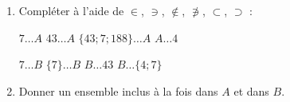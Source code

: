 \documentclass[main.tex]{subfiles}
\begin{document}
\begin{exerciseT} \hfill 
	\begin{enumerate}[leftmargin=*]
		\item 	Compléter à l'aide de $\in$, $\ni$, $\notin$, $\not\ni$, $\subset$, $\supset$  :
		
		$ 7\ldots A$ \qquad $43 \ldots A$ \qquad $\{43; 7; 188\} \ldots A$ \qquad $A\ldots 4$ 
		
		$ 7\ldots B$ \qquad $ \{7\}\ldots B$ \qquad $B \ldots 43$ \qquad $B\ldots \{ 4; 7\}$ \qquad 
		\item Donner un ensemble inclus à la fois dans $A$ et dans $B$.
	\end{enumerate}
\end{exerciseT} 
%	 

\newpage 
{}  
\pagestyle{scrheadings} %
\onehalfspacing
\end{document}
